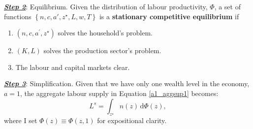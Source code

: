 \colorbox{Gray!25}{\textbf{\textit{\underline{Step 2}}}: Equilibrium.}
Given the distribution of labour productivity, $\Phi$, a set of functions $\left\{n,c,a',z^\star,L,w,T \right\}$ is a \textcolor{BurntOrange}{\textbf{stationary competitive equilibrium}} if
\begin{enumerate}
    \item $\left(n,c,a^\prime, z^\star \right)$ solves the household's problem.
    \item $(K,L)$ solves the production sector's problem. 
    \item The labour and capital markets clear. 
\end{enumerate}  

\colorbox{Gray!25}{\textbf{\textit{\underline{Step 3}}}: Simplification.}
Given that we have only one wealth level in the economy, $a=1$, the aggregate labour supply in Equation \eqref{a1_aggsup1} becomes:
\begin{equation}
    L^s = \int_{z^\star} n(z) \,  \mathrm{d}\Phi(z),
\end{equation}
where I set $\Phi(z)\equiv \Phi(z,1)$ for expositional clarity. 